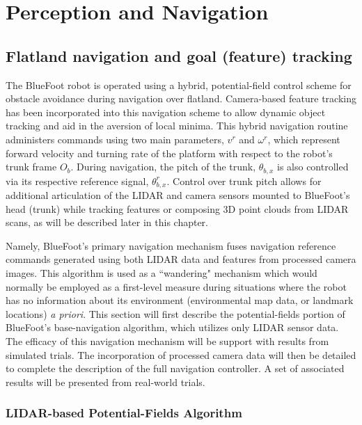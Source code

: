 \chapter{Perception and Navigation}
\label{ch::navigation}


	\section{Flatland navigation and goal (feature) tracking}
	
		The BlueFoot robot is operated using a hybrid, potential-field control scheme for obstacle avoidance during navigation over flatland. Camera-based feature tracking has been incorporated into this navigation scheme to allow dynamic object tracking and aid in the aversion of local minima. This hybrid navigation routine administers commands using two main parameters, $v^{r}$ and $\omega^{r}$, which represent forward velocity and turning rate of the platform with respect to the robot's trunk frame $O_{b}$. During navigation, the pitch of the trunk, $\theta_{b,x}$ is also controlled via its respective reference signal, $\theta_{b,x}^{r}$. Control over trunk pitch allows for additional articulation of the LIDAR and camera sensors mounted to BlueFoot's head (trunk) while tracking features or composing 3D point clouds from LIDAR scans, as will be described later in this chapter.

		Namely, BlueFoot's primary navigation mechanism fuses navigation reference commands generated using both LIDAR data and features from processed camera images. This algorithm is used as a ``wandering" mechanism which would normally be employed as a first-level measure during situations where the robot has no information about its environment (\IE environmental map data, or landmark locations) \emph{a priori}. This section will first describe the potential-fields portion of BlueFoot's base-navigation algorithm, which utilizes only LIDAR sensor data. The efficacy of this navigation mechanism will be support with results from simulated trials. The incorporation of processed camera data will then be detailed to complete the description of the full navigation controller. A set of associated results will be presented from real-world trials.

		\subsection{LIDAR-based Potential-Fields Algorithm}

